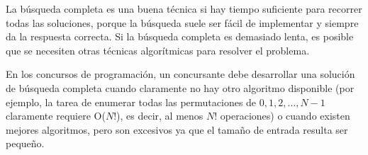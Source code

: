 La búsqueda completa es una buena técnica si hay tiempo suficiente para recorrer todas las soluciones, porque la búsqueda suele ser fácil de implementar y siempre da la respuesta correcta. Si la búsqueda completa es demasiado lenta, es posible que se necesiten otras técnicas algorítmicas para resolver el problema.

En los concursos de programación, un concursante debe desarrollar una solución de búsqueda completa cuando claramente no hay otro algoritmo disponible (por ejemplo, la tarea de enumerar todas las permutaciones de $0, 1, 2, \dots , N -1$ claramente requiere O($N!$), es decir, al menos $N!$ operaciones) o cuando existen mejores algoritmos, pero son excesivos ya que el tamaño de entrada resulta ser pequeño.
